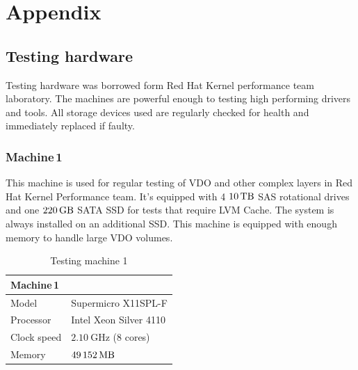 \documentclass[
  color, %
  table, %
  lof,   %
  lot,   %
]{fithesis3}
\begin{document}




\printbibliography[heading=bibintoc]



\chapter{Appendix}
\section{Testing hardware}
\label{hardware}
Testing hardware was borrowed form Red Hat Kernel performance team laboratory. The machines are powerful enough to testing high performing drivers and tools. All storage devices used are regularly checked for health and immediately replaced if faulty.


\subsection{Machine\,1}
\label{hw:1}
This machine is used for regular testing of VDO and other complex layers in Red Hat Kernel Performance team. It's equipped with 4 $\SI{10}{\tera\byte}$ SAS rotational drives and one $\SI{220}{\giga\byte}$ SATA SSD for tests that require LVM Cache. The system is always installed on an additional SSD. This machine is equipped with enough memory to handle large VDO volumes.


\begin{table}
\centering
\begin{tabular}{|l|l|}
\hline
   \multicolumn{2}{|l|}{Machine\,1} \\ \hline %
    Model & Supermicro X11SPL-F\\
    \hline
    Processor & Intel Xeon Silver 4110  \\
    \hline
    Clock speed & $\SI{2.10}{\giga\hertz}$ (8 cores) \\
    \hline
    Memory & $\SI{49152}{\mega\byte}$ \\
    \hline
\end{tabular}
\caption{Testing machine 1}
\end{table}
\end{document}
